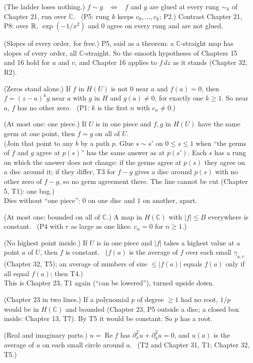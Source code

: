 \begin{lines}
\item[\lab{T1}] (The ladder loses nothing.) $f \sim g$ \ $\iff$ \ $f$ and $g$ are glued at every rung $\sim_k$ of Chapter 21, run over $\mathbb{C}$. \ (P5: rung $k$ keeps $c_0, \dots, c_k$; P2.) Contrast Chapter 21, P8: over $\mathbb{R}$, $\exp(-1/x^2)$ and $0$ agree on every rung and are not glued.
\item[\lab{T2}] (Slopes of every order, for free.) P5, said as a theorem: a $\mathbb{C}$-straight map has slopes of every order, all $\mathbb{C}$-straight. So the smooth hypotheses of Chapters 15 and 16 hold for $u$ and $v$, and Chapter 16 applies to $f\,dz$ as it stands (Chapter 32, R2).
\item[\lab{T3}] (Zeros stand alone.) If $f$ in $H(U)$ is not $0$ near $a$ and $f(a) = 0$, then $f = (z - a)^k g$ near $a$ with $g$ in $H$ and $g(a) \ne 0$, for exactly one $k \ge 1$. So near $a$, $f$ has no other zero. \ (P1: $k$ is the first $n$ with $c_n \ne 0$.)
\item[\lab{T4}] (At most one: one piece.) If $U$ is in one piece and $f, g$ in $H(U)$ have the same germ at one point, then $f = g$ on all of $U$. \\
(Join that point to any $b$ by a path $p$. Glue $s \sim s'$ on $0 \le s \le 1$ when ``the germs of $f$ and $g$ agree at $p(s)$'' has the same answer as at $p(s')$. Each $s$ has a rung on which the answer does not change: if the germs agree at $p(s)$ they agree on a disc around it; if they differ, T3 for $f - g$ gives a disc around $p(s)$ with no other zero of $f - g$, so no germ agreement there. The line cannot be cut (Chapter 5, T1): one bag.) \\
Dies without ``one piece'': $0$ on one disc and $1$ on another, apart.
\item[\lab{T5}] (At most one: bounded on all of $\mathbb{C}$.) A map in $H(\mathbb{C})$ with $|f| \le B$ everywhere is constant. \ (P4 with $r$ as large as one likes: $c_n = 0$ for $n \ge 1$.)
\item[\lab{T6}] (No highest point inside.) If $U$ is in one piece and $|f|$ takes a highest value at a point $a$ of $U$, then $f$ is constant. \ ($f(a)$ is the average of $f$ over each small $\gamma_{a,r}$ (Chapter 32, T5); an average of numbers of size $\le |f(a)|$ equals $f(a)$ only if all equal $f(a)$; then T4.) \\
This is Chapter 23, T1 again (``can be lowered''), turned upside down.
\item[\lab{T7}] (Chapter 23 in two lines.) If a polynomial $p$ of degree $\ge 1$ had no root, $1/p$ would be in $H(\mathbb{C})$ and bounded (Chapter 23, P5 outside a disc; a closed box inside: Chapter 13, T7). By T5 it would be constant. So $p$ has a root.
\item[\lab{T8}] (Real and imaginary parts.) $u = \operatorname{Re} f$ has $\partial_x^2 u + \partial_y^2 u = 0$, and $u(a)$ is the average of $u$ on each small circle around $a$. \ (T2 and Chapter 31, T1; Chapter 32, T5.)
\end{lines}

